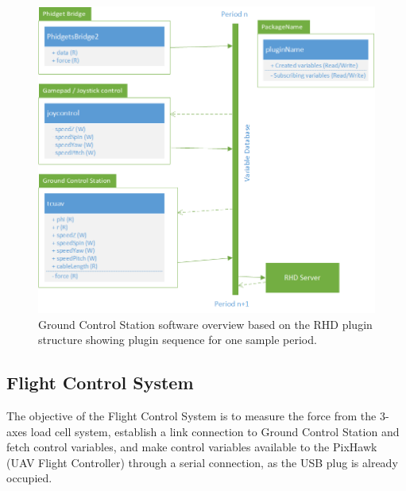 \begin{figure}[hbtp]
\centering
\includegraphics[scale=0.8]{graphics/Visio/GCS-software-overview.png}
\caption[Ground Control Station software overview]{Ground Control Station software overview based on the RHD plugin structure showing plugin sequence for one sample period.}
\label{fig:GCS-software-overview}
\end{figure}




\subsection{Flight Control System}
The objective of the Flight Control System is to measure the force from the 3-axes load cell system, establish a link connection to Ground Control Station and fetch control variables, and make control variables available to the PixHawk (UAV Flight Controller) through a serial connection, as the USB plug is already occupied.


